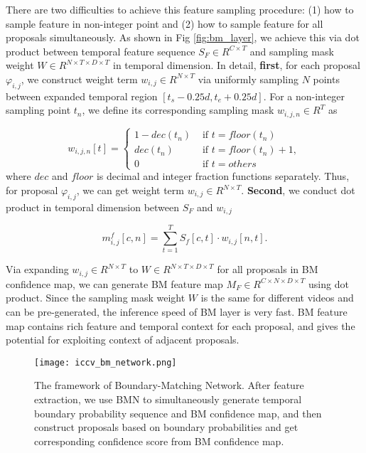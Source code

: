 \documentclass[10pt,twocolumn,letterpaper]{article}
\begin{document}
There are two difficulties to achieve this feature sampling procedure: (1) how to sample feature in non-integer point and (2) how to sample feature for all proposals simultaneously.
As shown in Fig \ref{fig:bm_layer}, we achieve this via dot product between temporal feature sequence $S_F \in R^{C\times T}$ and sampling mask weight  $W  \in R^{N\times T \times D \times T}$ in temporal dimension.
In detail, \textbf{first}, for each proposal $\varphi_{i,j}$, we construct  weight term $w_{i,j} \in R^{N\times T}$ via uniformly sampling $N$ points between expanded temporal region $[ t_s - 0.25d, t_e + 0.25d]$. 
For a non-integer sampling point $t_n$, we define its corresponding sampling mask $w_{i,j,n} \in R^T$ as

\begin{equation}
w_{i,j,n}[t]=
\begin{cases}
1 - dec(t_n) & \text{ if } t= floor(t_n)\\ 
dec(t_n) & \text{ if } t= floor(t_n) +1,\\ 
0 & \text{ if } t= others
\end{cases}
\end{equation}
where $dec$ and $floor$ is decimal and integer fraction functions separately.
Thus, for proposal $\varphi_{i,j}$, we can get weight term $w_{i,j} \in R^{N\times T}$.
\textbf{Second}, we conduct dot product in temporal dimension between $S_F$ and $w_{i,j}$
 
\begin{equation}
 m^f_{i,j}[c,n] = \sum_{t=1}^T S_f[c,t] \cdot  w_{i,j}[n,t].
\end{equation}

Via expanding $w_{i,j} \in R^{N\times T}$ to $W  \in R^{N\times T \times D \times T}$ for all proposals in BM confidence map, we can generate BM feature map $M_F \in R^{C \times N \times D \times T}$ using dot product. 
Since the sampling mask weight $W$ is the same for different videos and can be pre-generated, the inference speed of BM layer is very fast.
BM feature map contains rich feature and temporal context for each proposal, and gives the potential for exploiting context of adjacent proposals.


\begin{figure}[t]
\begin{center}
\begin{minipage}[b]{1.0\linewidth}
  \centering
  \centerline{\texttt{[image: iccv\_bm\_network.png]}}
  \medskip
\end{minipage}
\end{center}
   \caption{The framework of Boundary-Matching Network. After feature extraction, we use BMN to simultaneously generate temporal boundary probability sequence and BM confidence map, and then construct proposals based on boundary probabilities and get corresponding confidence score from BM confidence map.}
\label{fig:bmn_framework}
\end{figure}
\end{document}
